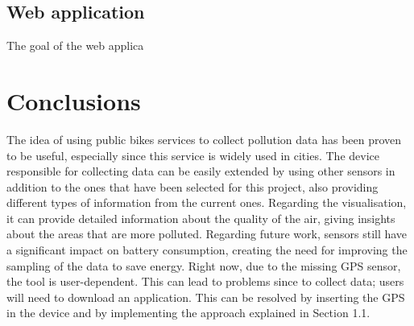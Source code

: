 \documentclass[12pt]{article}
\begin{document}
  \subsection{Web application}
  The goal of the web applica
  \newpage
  \section{Conclusions}
  The idea of using public bikes services to collect pollution data has been proven to be useful, especially since this service is widely used in cities. The device responsible for collecting data can be easily extended by using other sensors in addition to the ones that have been selected for this project, also providing different types of information from the current ones. Regarding the visualisation, it can provide detailed information about the quality of the air, giving insights about the areas that are more polluted. Regarding future work, sensors still have a significant impact on battery consumption, creating the need for improving the sampling of the data to save energy.  Right now, due to the missing GPS sensor, the tool is user-dependent. This can lead to problems since to collect data; users will need to download an application. This can be resolved by inserting the GPS in the device and by implementing the approach explained in Section 1.1.   
\end{document}
